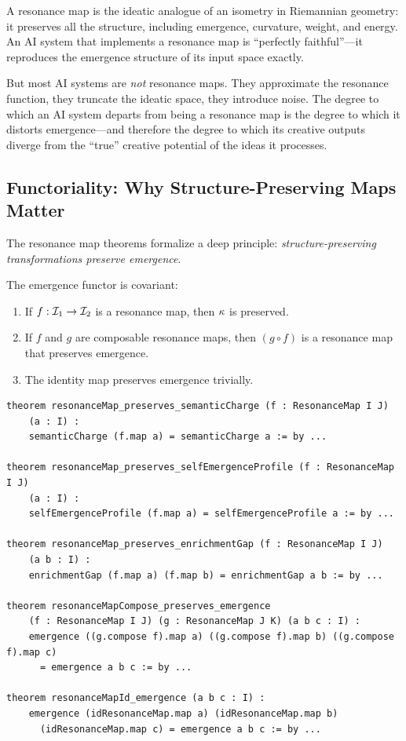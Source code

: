 \begin{interpretation}
A resonance map is the ideatic analogue of an isometry in Riemannian geometry:
it preserves all the structure, including emergence, curvature, weight, and
energy. An AI system that implements a resonance map is ``perfectly faithful''---it
reproduces the emergence structure of its input space exactly.

But most AI systems are \emph{not} resonance maps. They approximate the resonance
function, they truncate the ideatic space, they introduce noise. The degree to
which an AI system departs from being a resonance map is the degree to which it
distorts emergence---and therefore the degree to which its creative outputs
diverge from the ``true'' creative potential of the ideas it processes.
\end{interpretation}

\subsection{Functoriality: Why Structure-Preserving Maps Matter}

The resonance map theorems formalize a deep principle: \emph{structure-preserving
transformations preserve emergence}.

\begin{theorem}
\label{thm:functoriality}
The emergence functor is covariant:
\begin{enumerate}
  \item If $f : \mathcal{I}_1 \to \mathcal{I}_2$ is a resonance map, then $\kappa$ is preserved.
  \item If $f$ and $g$ are composable resonance maps, then $(g \circ f)$ is a
    resonance map that preserves emergence.
  \item The identity map preserves emergence trivially.
\end{enumerate}
\end{theorem}

\begin{lstlisting}[caption={Functoriality (IDT\_v3\_Emergence.lean)}]
theorem resonanceMap_preserves_semanticCharge (f : ResonanceMap I J)
    (a : I) :
    semanticCharge (f.map a) = semanticCharge a := by ...

theorem resonanceMap_preserves_selfEmergenceProfile (f : ResonanceMap I J)
    (a : I) :
    selfEmergenceProfile (f.map a) = selfEmergenceProfile a := by ...

theorem resonanceMap_preserves_enrichmentGap (f : ResonanceMap I J)
    (a b : I) :
    enrichmentGap (f.map a) (f.map b) = enrichmentGap a b := by ...

theorem resonanceMapCompose_preserves_emergence
    (f : ResonanceMap I J) (g : ResonanceMap J K) (a b c : I) :
    emergence ((g.compose f).map a) ((g.compose f).map b) ((g.compose f).map c)
      = emergence a b c := by ...

theorem resonanceMapId_emergence (a b c : I) :
    emergence (idResonanceMap.map a) (idResonanceMap.map b)
      (idResonanceMap.map c) = emergence a b c := by ...
\end{lstlisting}

